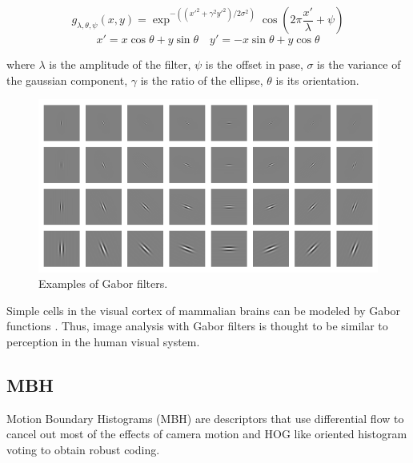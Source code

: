\begin{equation}
g_{\lambda, \theta, \psi}(x,y) = \exp^{-((x'^2+\gamma^2y'^2)/2\sigma^2)} \cos \left(2\pi \frac{x'}{\lambda}+\psi \right)
\end{equation}
$$ x' = x \cos \theta + y \sin \theta \quad y'=-x\sin\theta +y\cos\theta $$

where $\lambda$ is the amplitude of the filter, $\psi$ is the offset in pase, $\sigma$ is the variance of the gaussian component, $\gamma$ is the ratio of the ellipse, $\theta$ is its orientation.
\begin{figure}[htbp]
	\centering
		\includegraphics[width=\linewidth]{Figures/gabor.png}
	\caption{Examples of Gabor filters.}
	\label{fig:Gabor}
\end{figure}

Simple cells in the visual cortex of mammalian brains can be modeled by Gabor functions \cite{marvcelja1980mathematical}. Thus, image analysis with Gabor filters is thought to be similar to perception in the human visual system.

\subsection{MBH}
Motion Boundary Histograms (MBH) \cite{dalal2005histograms} are descriptors that use differential flow to cancel out most of the effects of camera motion and HOG like oriented histogram voting to obtain robust coding.

